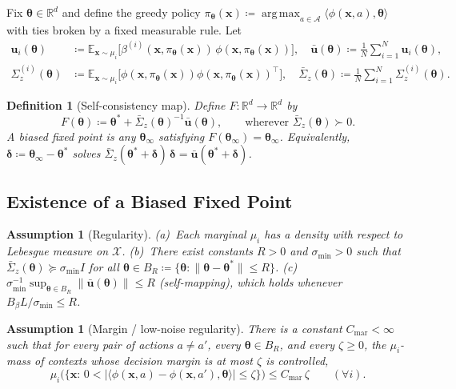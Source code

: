 \documentclass[11pt]{article}
\newtheorem{definition}[theorem]{Definition}
\newtheorem{assumption}[theorem]{Assumption}
\DeclareMathOperator*{\argmax}{arg\,max}
\begin{document}
Fix $\bm{\theta}\in\mathbb{R}^d$ and define the greedy policy
$\pi_{\bm{\theta}}(\bm{x})\coloneqq\argmax_{a\in\mathcal{A}}
\langle\phi(\bm{x},a),\bm{\theta}\rangle$
with ties broken by a fixed measurable rule.  Let
\begin{align}
\bm{u}_i(\bm{\theta})&\coloneqq
\mathbb{E}_{\bm{x}\sim\mu_i}\bigl[\beta^{(i)}(\bm{x},\pi_{\bm{\theta}}(\bm{x}))\,
\phi(\bm{x},\pi_{\bm{\theta}}(\bm{x}))\bigr],\quad
\bar{\bm{u}}(\bm{\theta})\coloneqq\tfrac{1}{N}\sum_{i=1}^N\bm{u}_i(\bm{\theta}),
\label{eq:u_policy}\\
\Sigma_z^{(i)}(\bm{\theta})&\coloneqq
\mathbb{E}_{\bm{x}\sim\mu_i}\bigl[\phi(\bm{x},\pi_{\bm{\theta}}(\bm{x}))
\phi(\bm{x},\pi_{\bm{\theta}}(\bm{x}))^\top\bigr],\quad
\bar{\Sigma}_z(\bm{\theta})\coloneqq\tfrac{1}{N}\sum_{i=1}^N\Sigma_z^{(i)}(\bm{\theta}).
\label{eq:Sigma_policy}
\end{align}

\begin{definition}[Self-consistency map]\label{def:F}
Define $F:\mathbb{R}^d\to\mathbb{R}^d$ by
\[
F(\bm{\theta})\coloneqq\bm{\theta}^{\!*}+\bar{\Sigma}_z(\bm{\theta})^{-1}\bar{\bm{u}}(\bm{\theta}),
\qquad\text{wherever }\bar{\Sigma}_z(\bm{\theta})\succ 0.
\]
A \emph{biased fixed point} is any $\bm{\theta}_\infty$ satisfying
$F(\bm{\theta}_\infty)=\bm{\theta}_\infty$. Equivalently,
$\bm{\delta}\coloneqq\bm{\theta}_\infty-\bm{\theta}^{\!*}$ solves
$\bar{\Sigma}_z(\bm{\theta}^{\!*}+\bm{\delta})\,\bm{\delta}
=\bar{\bm{u}}(\bm{\theta}^{\!*}+\bm{\delta})$.
\end{definition}

\subsection{Existence of a Biased Fixed Point}

\begin{assumption}[Regularity]\label{ass:reg}
(a)~Each marginal $\mu_i$ has a density with respect to Lebesgue
measure on $\mathcal{X}$.
(b)~There exist constants $R>0$ and $\sigma_{\min}>0$ such that
$\bar{\Sigma}_z(\bm{\theta})\succeq\sigma_{\min}I$ for all
$\bm{\theta}\in B_R\coloneqq\{\bm{\theta}:\|\bm{\theta}-\bm{\theta}^{\!*}\|\leq R\}$.
(c)~$\sigma_{\min}^{-1}\sup_{\bm{\theta}\in B_R}\|\bar{\bm{u}}(\bm{\theta})\|\leq R$
(self-mapping), which holds whenever $B_\beta L/\sigma_{\min}\leq R$.
\end{assumption}

\begin{assumption}[Margin / low-noise regularity]\label{ass:margin}
There is a constant $C_{\mathrm{mar}}<\infty$ such that for every pair
of actions $a\neq a'$, every $\bm{\theta}\in B_R$, and every $\zeta\geq 0$,
the $\mu_i$-mass of contexts whose decision margin is at most $\zeta$
is controlled,
\[
\mu_i\bigl(\{\bm{x}:\,
0<|\langle\phi(\bm{x},a)-\phi(\bm{x},a'),\bm{\theta}\rangle|\leq\zeta\}\bigr)
\leq C_{\mathrm{mar}}\,\zeta
\qquad(\forall i).
\]
\end{assumption}
\end{document}
